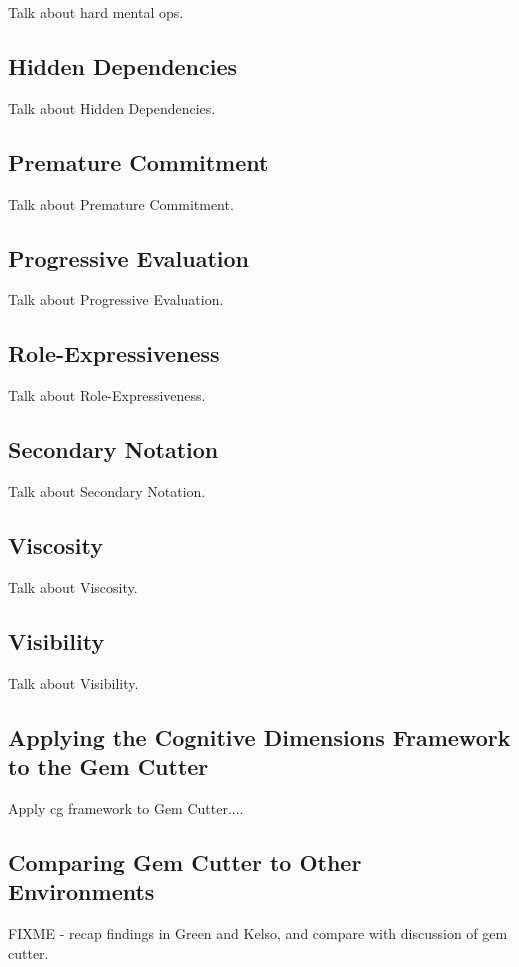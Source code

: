 Talk about hard mental ops.

\subsection{Hidden Dependencies}
\label{hiddendependenciesoutline}

Talk about Hidden Dependencies.

\subsection{Premature Commitment}
\label{prematurecommitmentoutline}

Talk about Premature Commitment.

\subsection{Progressive Evaluation}
\label{progressiveevaluationoutline}

Talk about Progressive Evaluation.

\subsection{Role-Expressiveness}
\label{roleexpressivenessoutline}

Talk about Role-Expressiveness.

\subsection{Secondary Notation}
\label{secondarynotationoutline}

Talk about Secondary Notation.

\subsection{Viscosity}
\label{viscosityoutline}

Talk about Viscosity.

\subsection{Visibility}
\label{visibilityoutline}

Talk about Visibility.

\subsection{Applying the Cognitive Dimensions Framework to the Gem Cutter}

Apply cg framework to Gem Cutter....

\subsection{Comparing Gem Cutter to Other Environments}

FIXME - recap findings in Green and Kelso, and compare with discussion of gem cutter.